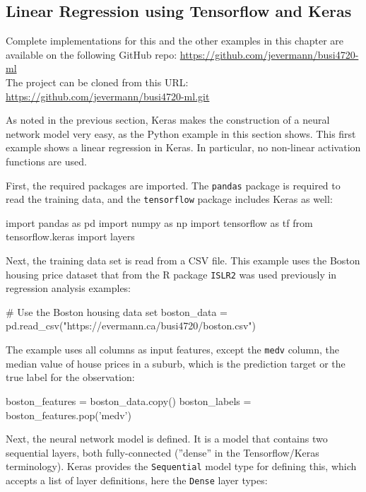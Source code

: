 \begin{withcode}
\section{Linear Regression using Tensorflow and Keras}

\begin{resourcebox}
\footnotesize
Complete implementations for this and the other examples in this chapter are available on the following GitHub repo:
\url{https://github.com/jevermann/busi4720-ml} \\

The project can be cloned from this URL:
\url{https://github.com/jevermann/busi4720-ml.git}
\normalsize
\end{resourcebox}

As noted in the previous section, Keras makes the construction of a neural network model very easy, as the Python example in this section shows. This first example shows a linear regression in Keras. In particular, no non-linear activation functions are used. 

First, the required packages are imported. The \texttt{pandas} package is required to read the training data, and the \texttt{tensorflow} package includes Keras as well:

\begin{pythoncode}
import pandas as pd
import numpy as np
import tensorflow as tf
from tensorflow.keras import layers
\end{pythoncode}

Next, the training data set is read from a CSV file. This example uses the Boston housing price dataset that from the R package \texttt{ISLR2} was used previously in regression analysis examples:

\begin{pythoncode}
# Use the Boston housing data set
boston_data = pd.read_csv("https://evermann.ca/busi4720/boston.csv")
\end{pythoncode}

The example uses all columns as input features, except the \texttt{medv} column, the median value of house prices in a suburb, which is the prediction target or the true label for the observation:

\begin{pythoncode}
boston_features = boston_data.copy()
boston_labels = boston_features.pop('medv')
\end{pythoncode}

Next, the neural network model is defined. It is a model that contains two sequential layers, both fully-connected (''dense'' in the Tensorflow/Keras terminology). Keras provides the \texttt{Sequential} model type for defining this, which accepts a list of layer definitions, here the \texttt{Dense} layer types:


\end{withcode}
